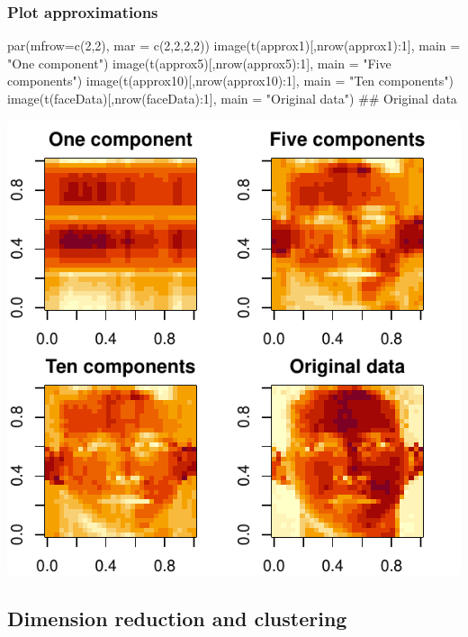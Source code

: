 \documentclass[a4paper]{article}\usepackage[]{graphicx}\usepackage[]{xcolor}
\makeatletter
\def\maxwidth{ %
  \ifdim\Gin@nat@width>\linewidth
    \linewidth
  \else
    \Gin@nat@width
  \fi
}
\makeatother
\begin{document}
\subsubsection{Plot approximations}
\begin{Schunk}
\begin{Sinput}
par(mfrow=c(2,2), mar = c(2,2,2,2))
image(t(approx1)[,nrow(approx1):1], main = "One component")
image(t(approx5)[,nrow(approx5):1], main = "Five components")
image(t(approx10)[,nrow(approx10):1], main = "Ten components")
image(t(faceData)[,nrow(faceData):1], main = "Original data")  ## Original data
\end{Sinput}


{\centering \includegraphics[width=\maxwidth]{figure/listings-unnamed-chunk-494-1} 

}

\end{Schunk}
\subsection{Dimension reduction and clustering}
\end{document}
